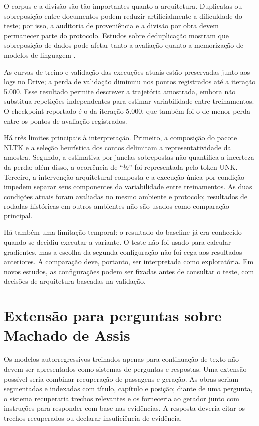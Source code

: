 \documentclass[conference]{IEEEtran}
\begin{document}
O corpus e a divisão são tão importantes quanto a arquitetura. Duplicatas ou sobreposição entre documentos podem reduzir artificialmente a dificuldade do teste; por isso, a auditoria de proveniência e a divisão por obra devem permanecer parte do protocolo. Estudos sobre deduplicação mostram que sobreposição de dados pode afetar tanto a avaliação quanto a memorização de modelos de linguagem \cite{lee2022}.

As curvas de treino e validação das execuções atuais estão preservadas junto aos logs no Drive; a perda de validação diminuiu nos pontos registrados até a iteração 5.000. Esse resultado permite descrever a trajetória amostrada, embora não substitua repetições independentes para estimar variabilidade entre treinamentos. O checkpoint reportado é o da iteração 5.000, que também foi o de menor perda entre os pontos de avaliação registrados.

Há três limites principais à interpretação. Primeiro, a composição do pacote NLTK e a seleção heurística dos contos delimitam a representatividade da amostra. Segundo, a estimativa por janelas sobrepostas não quantifica a incerteza da perda; além disso, a ocorrência de ``½'' foi representada pelo token UNK. Terceiro, a intervenção arquitetural composta e a execução única por condição impedem separar seus componentes da variabilidade entre treinamentos. As duas condições atuais foram avaliadas no mesmo ambiente e protocolo; resultados de rodadas históricas em outros ambientes não são usados como comparação principal.

Há também uma limitação temporal: o resultado do baseline já era conhecido quando se decidiu executar a variante. O teste não foi usado para calcular gradientes, mas a escolha da segunda configuração não foi cega aos resultados anteriores. A comparação deve, portanto, ser interpretada como exploratória. Em novos estudos, as configurações podem ser fixadas antes de consultar o teste, com decisões de arquitetura baseadas na validação.

\section{Extensão para perguntas sobre Machado de Assis}

Os modelos autorregressivos treinados apenas para continuação de texto não devem ser apresentados como sistemas de perguntas e respostas. Uma extensão possível seria combinar recuperação de passagens e geração. As obras seriam segmentadas e indexadas com título, capítulo e posição; diante de uma pergunta, o sistema recuperaria trechos relevantes e os forneceria ao gerador junto com instruções para responder com base nas evidências. A resposta deveria citar os trechos recuperados ou declarar insuficiência de evidência.
\end{document}
